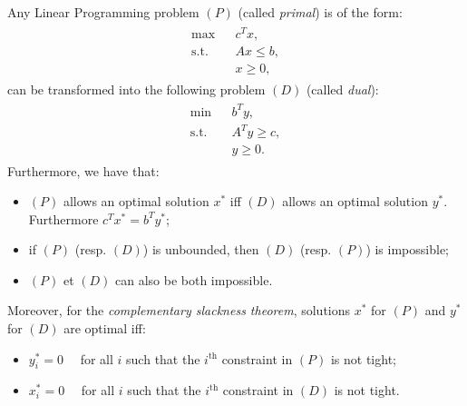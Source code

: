 \documentclass{../ape}
\begin{document}
\begin{itemize}[leftmargin=*]
	Any Linear Programming problem $(P)$ (called \emph{primal}) is of the form:
	\begin{align*}
		\begin{array}{lll}
			\max && c^T x, \\ 
			\mbox{s.t.} && Ax \leq b, \\
			&& x \geq 0,
		\end{array}
	\end{align*} 
	can be transformed into the following problem $(D)$ (called \emph{dual}):
	\begin{align*}
		\begin{array}{lll}
			\min && b^T y, \\ 
			\mbox{s.t.} && A^T y \geq c, \\
			&& y \geq 0.
		\end{array}
	\end{align*} 
	Furthermore, we have that:
	\begin{itemize}
		\item $(P)$ allows an optimal solution $x^*$ iff $(D)$ allows an optimal solution $y^*$. Furthermore $c^T x^* = b^T y^*$;
		\item if $(P)$ (resp. $(D)$) is unbounded, then $(D)$ (resp. $(P)$) is impossible;
		\item $(P)$ et $(D)$ can also be both impossible.
	\end{itemize}
	\vspace{.5cm}
	Moreover, for the \emph{complementary slackness theorem}, solutions $x^*$ for $(P)$ and $y^*$ for $(D)$ are optimal iff:
	\begin{itemize}
		\item $y_i^* = 0 \quad$ for all $i$ such that the $i^{\text{th}}$ constraint in $(P)$ is not tight;
		\item $x_i^* = 0 \quad$ for all $i$ such that the $i^{\text{th}}$ constraint in $(D)$ is not tight.
	\end{itemize}
		
\end{itemize}
\end{document}

